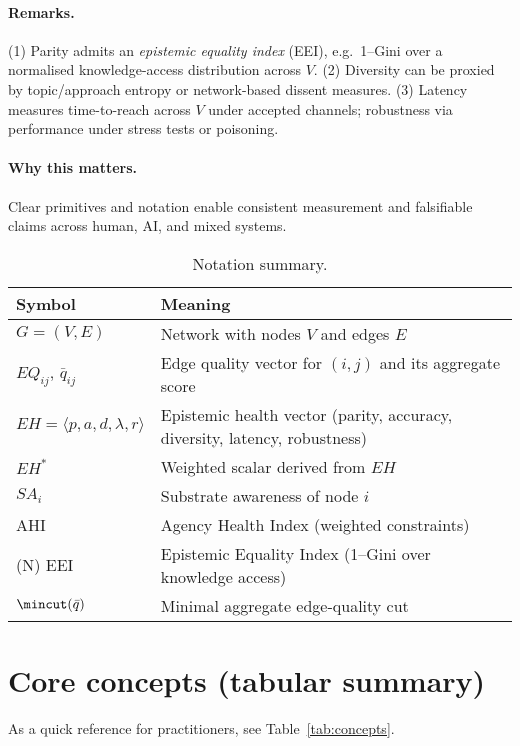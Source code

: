 \documentclass[12pt]{article}
\begin{document}
\paragraph{Remarks.}
(1) Parity admits an \emph{epistemic equality index} (EEI), e.g.\ 1--Gini over a normalised knowledge-access distribution across $V$. 
(2) Diversity can be proxied by topic/approach entropy or network-based dissent measures. 
(3) Latency measures time-to-reach across $V$ under accepted channels; robustness via performance under stress tests or poisoning.

\paragraph{Why this matters.} Clear primitives and notation enable consistent measurement and falsifiable claims across human, AI, and mixed systems.

\begin{table}[htbp]
\centering
\small
\caption{Notation summary.}
\label{tab:notation}
\begin{tabularx}{\linewidth}{lY}
\toprule
\textbf{Symbol} & \textbf{Meaning} \\
\midrule
$G=(V,E)$ & Network with nodes $V$ and edges $E$ \\
$EQ_{ij}$, $\bar q_{ij}$ & Edge quality vector for $(i,j)$ and its aggregate score \\
$EH=\langle p,a,d,\lambda,r\rangle$ & Epistemic health vector (parity, accuracy, diversity, latency, robustness) \\
$EH^{\ast}$ & Weighted scalar derived from $EH$ \\
$SA_i$ & Substrate awareness of node $i$ \\
AHI & Agency Health Index (weighted constraints) \\ (N)
EEI & Epistemic Equality Index (1--Gini over knowledge access) \\
$\mincut(\bar q)$ & Minimal aggregate edge-quality cut \\

\bottomrule
\end{tabularx}
\end{table}

\section{Core concepts (tabular summary)} As a quick reference for practitioners, see Table~\ref{tab:concepts}.

\label{sec:concepts}
\setlength{\extrarowheight}{2pt}
\setlength{\tabcolsep}{6pt}
\end{document}
